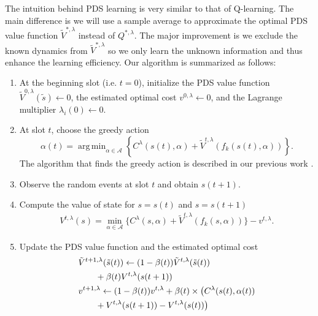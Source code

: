\documentclass[lettersize, journal]{IEEEtran}
\DeclareMathOperator*{\argmin}{arg\,min}
\begin{document}
The intuition behind PDS learning is very similar to that of Q-learning.
The main difference is we will use a sample average to approximate the optimal PDS value function $\tilde{V}^{*, \lambda}$ instead of $Q^{*, \lambda}$.
The major improvement is we exclude the known dynamics from $\tilde{V}^{*, \lambda}$ so we only learn the unknown information and thus enhance the learning efficiency.
Our algorithm is summarized as follows:
\begin{enumerate}
    \item At the beginning slot (i.e. $t = 0$), initialize the PDS value function $\tilde{V}^{0, \lambda}(\tilde{s}) \leftarrow 0$, the estimated optimal cost 
        $v^{0, \lambda} \leftarrow 0$, and the Lagrange multiplier $\lambda_i(0) \leftarrow 0$.
    \item At slot $t$, choose the greedy action
        \begin{equation}
            \alpha(t) = \argmin_{\alpha\in\mathcal{A}} \left\{ C^{\lambda}(s(t), \alpha) + \tilde{V}^{t, \lambda}( f_k(s(t), \alpha) ) \right\}.
            \label{prob:greedy}
        \end{equation}
        The algorithm that finds the greedy action is described in our previous work \cite{he2022age}.
    \item Observe the random events at slot $t$ and obtain $s(t+1)$.
    \item Compute the value of state for $s=s(t)$ and $s=s(t+1)$
        \begin{align}
            V^{t, \lambda}(s) = \min_{\alpha\in\mathcal{A}} \Big\{ C^{\lambda}(s, \alpha)
            + \tilde{V}^{t, \lambda}(f_k(s, \alpha)) \Big\} - v^{t, \lambda}.
            \label{eq:V_V_tilde}
        \end{align}
    \item Update the PDS value function and the estimated optimal cost
        \begin{align}
            &\tilde{V}^{t+1, \lambda}(\tilde{s}(t)) \leftarrow (1 - \beta(t)) \tilde{V}^{t, \lambda}(\tilde{s}(t)) \notag \\
            &\qquad + \beta(t) V^{t, \lambda}(s(t+1)) \label{eq:PDS_update_V} \\
            &v^{t+1, \lambda} \leftarrow (1 - \beta(t)) v^{t, \lambda} + \beta(t) \times \bigl( C^{\lambda}(s(t), \alpha(t)) \notag \\
            &\qquad + V^{t, \lambda}(s(t+1)) - V^{t, \lambda}(s(t)) \bigr) \label{eq:PDS_update_v}
        \end{align}

\end{enumerate}
\end{document}
